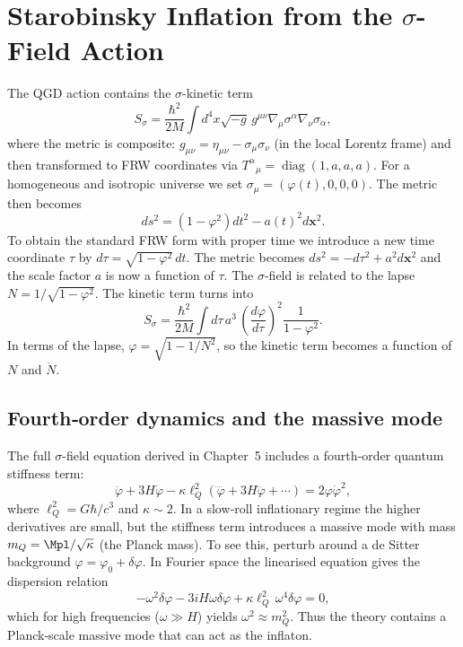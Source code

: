 \section{Starobinsky Inflation from the $\sigma$-Field Action}
\label{sec:inflation_from_sigma}

The QGD action contains the $\sigma$-kinetic term
\begin{equation}
S_\sigma = \frac{\hbar^2}{2M}\int d^4x\sqrt{-g}\, g^{\mu\nu}\nabla_\mu\sigma^\alpha\nabla_\nu\sigma_\alpha,
\end{equation}
where the metric is composite: $g_{\mu\nu}=\eta_{\mu\nu}-\sigma_\mu\sigma_\nu$ (in the local Lorentz frame) and then transformed to FRW coordinates via $T^\alpha{}_\mu=\operatorname{diag}(1,a,a,a)$. For a homogeneous and isotropic universe we set $\sigma_\mu=(\varphi(t),0,0,0)$. The metric then becomes
\begin{equation}
ds^2 = (1-\varphi^2)dt^2 - a(t)^2 d\mathbf{x}^2.
\end{equation}
To obtain the standard FRW form with proper time we introduce a new time coordinate $\tau$ by $d\tau = \sqrt{1-\varphi^2}\,dt$. The metric becomes $ds^2 = -d\tau^2 + a^2 d\mathbf{x}^2$ and the scale factor $a$ is now a function of $\tau$. The $\sigma$-field is related to the lapse $N=1/\sqrt{1-\varphi^2}$. The kinetic term turns into
\begin{equation}
S_\sigma = \frac{\hbar^2}{2M}\int d\tau\, a^3\, \left(\frac{d\varphi}{d\tau}\right)^{\!2}\frac{1}{1-\varphi^2}.
\end{equation}
In terms of the lapse, $\varphi=\sqrt{1-1/N^2}$, so the kinetic term becomes a function of $N$ and $\dot N$.

\subsection{Fourth‑order dynamics and the massive mode}
The full $\sigma$-field equation derived in Chapter~5 includes a fourth‑order quantum stiffness term:
\begin{equation}
\ddot\varphi + 3H\dot\varphi - \kappa\ell_Q^2\!\left(\ddddot\varphi + 3H\dddot\varphi + \cdots\right) = 2\varphi\dot\varphi^2,
\label{eq:sigma_fourth}
\end{equation}
where $\ell_Q^2 = G\hbar/c^3$ and $\kappa\sim2$. In a slow‑roll inflationary regime the higher derivatives are small, but the stiffness term introduces a massive mode with mass $m_Q = \Mpl/\sqrt{\kappa}$ (the Planck mass). To see this, perturb around a de Sitter background $\varphi=\varphi_0+\delta\varphi$. In Fourier space the linearised equation gives the dispersion relation
\begin{equation}
-\omega^2\delta\varphi -3iH\omega\delta\varphi + \kappa\ell_Q^2\,\omega^4\delta\varphi = 0,
\end{equation}
which for high frequencies ($\omega\gg H$) yields $\omega^2\approx m_Q^2$. Thus the theory contains a Planck‑scale massive mode that can act as the inflaton.

